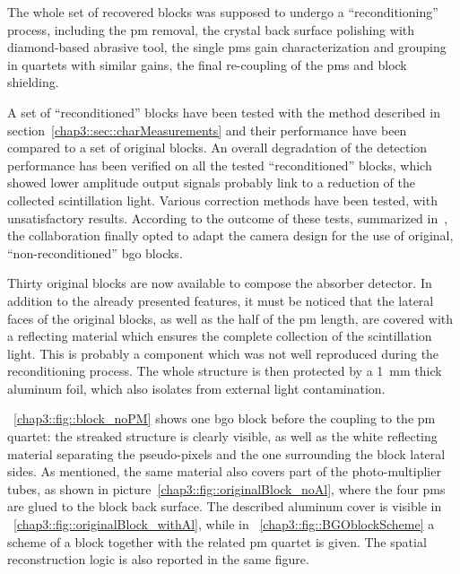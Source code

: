 The whole set of recovered blocks was supposed to undergo a \enquote{reconditioning} process, including the \gls{pm} removal, the crystal back surface polishing with diamond-based abrasive tool, the single \glspl{pm} gain characterization and grouping in quartets with similar gains, the final re-coupling of the \glspl{pm} and block shielding.

A set of \enquote{reconditioned} blocks have been tested with the method described in section~\ref{chap3::sec::charMeasurements} and their performance have been compared to a set of original blocks. An overall degradation of the detection performance has been verified on all the tested \enquote{reconditioned} blocks, which showed lower amplitude output signals probably link to a reduction of the collected scintillation light. Various correction methods have been tested, with unsatisfactory results. According to the outcome of these tests, summarized in~\cite{Sandjong2017}, the collaboration finally opted to adapt the camera design for the use of original, \enquote{non-reconditioned} \gls{bgo} blocks.
  
Thirty original blocks are now available to compose the absorber detector. In addition to the already presented features, it must be noticed that the lateral faces of the original blocks, as well as the half of the \gls{pm} length, are covered with a reflecting material which ensures the complete collection of the scintillation light. This is probably a component which was not well reproduced during the reconditioning process. The whole structure is then protected by a 1~mm thick aluminum foil, which also isolates from external light contamination.

\figurename~\ref{chap3::fig::block_noPM} shows one \gls{bgo} block before the coupling to the \gls{pm} quartet: the streaked structure is clearly visible, as well as the white reflecting material separating the pseudo-pixels and the one surrounding the block lateral sides. As mentioned, the same material also covers part of the photo-multiplier tubes, as shown in picture~\ref{chap3::fig::originalBlock_noAl}, where the four \glspl{pm} are glued to the block back surface. The described aluminum cover is visible in \figurename~\ref{chap3::fig::originalBlock_withAl}, while in \figurename~\ref{chap3::fig::BGOblockScheme} a scheme of a block together with the related \gls{pm} quartet is given. The spatial reconstruction logic is also reported in the same figure. 
 
